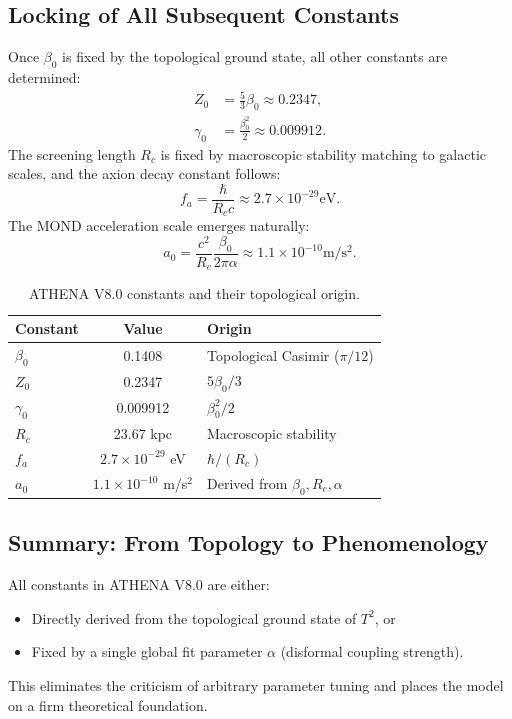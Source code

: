 \documentclass[11pt,a4paper]{article}
\begin{document}
\subsection{Locking of All Subsequent Constants}
Once \(\beta_0\) is fixed by the topological ground state, all other constants are determined:
\begin{align}
Z_0 &= \frac{5}{3}\beta_0\approx 0.2347, \tag{17}\\
\gamma_0 &= \frac{\beta_0^2}{2}\approx 0.009912. \tag{18}
\end{align}
The screening length \(R_c\) is fixed by macroscopic stability matching to galactic scales, and the axion decay constant follows:
\begin{equation}
f_{a} = \frac{\hbar}{R_{c}c}\approx 2.7\times 10^{-29}\mathrm{eV}. \tag{19}
\end{equation}
The MOND acceleration scale emerges naturally:
\begin{equation}
a_0 = \frac{c^2}{R_c}\frac{\beta_0}{2\pi\alpha}\approx 1.1\times 10^{-10}\mathrm{m / s^2}. \tag{20}
\end{equation}

\begin{table}[H]
\centering
\caption{ATHENA V8.0 constants and their topological origin.}
\begin{tabular}{lcl}
\toprule
Constant & Value & Origin \\
\midrule
\(\beta_0\) & 0.1408 & Topological Casimir (\(\pi/12\)) \\
\(Z_0\) & 0.2347 & \(5\beta_0/3\) \\
\(\gamma_0\) & 0.009912 & \(\beta_0^2/2\) \\
\(R_c\) & 23.67 kpc & Macroscopic stability \\
\(f_a\) & \(2.7\times10^{-29}\) eV & \(\hbar/(R_c)\) \\
\(a_0\) & \(1.1\times10^{-10}\) m/s\(^2\) & Derived from \(\beta_0, R_c, \alpha\) \\
\bottomrule
\end{tabular}
\end{table}

\subsection{Summary: From Topology to Phenomenology}
All constants in ATHENA V8.0 are either:
\begin{itemize}
\item Directly derived from the topological ground state of \(T^2\), or
\item Fixed by a single global fit parameter \(\alpha\) (disformal coupling strength).
\end{itemize}
This eliminates the criticism of arbitrary parameter tuning and places the model on a firm theoretical foundation.
\end{document}
